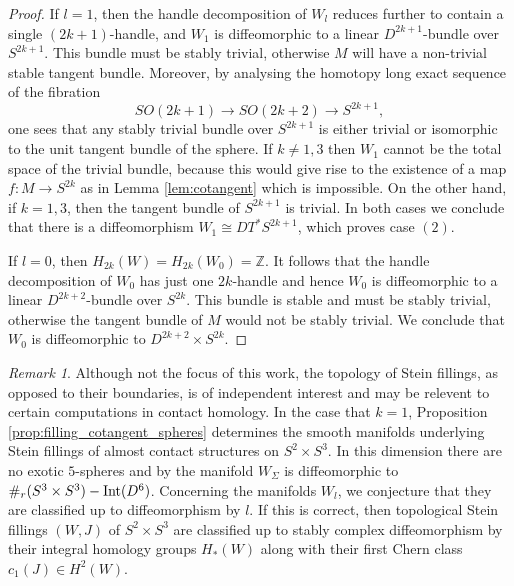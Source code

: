 \documentclass[12pt]{amsart}
\newcommand\Z{\mathbb{Z}}
\theoremstyle{remark}
\newtheorem{Remark}[Theorem]{Remark}
\newcommand{\jbcomm}[1]{\begingroup\color{green}JB:~#1\endgroup}
\begin{document}
\begin{proof}
If $l = 1$, then the handle decomposition of $W_l$ reduces further to
contain a single $(2k{+}1)$-handle, and $W_1$ is diffeomorphic to a
linear $D^{2k{+}1}$-bundle over $S^{2k{+}1}$.  This bundle must be stably
trivial, otherwise $M$ will have a non{-}trivial stable tangent bundle.
Moreover, by analysing the homotopy long exact sequence of the fibration
\[
SO(2k{+}1) \to SO(2k{+}2) \to S^{2k{+}1},
\]
one sees that any stably trivial bundle over $S^{2k{+}1}$ is either
trivial or isomorphic to the unit tangent bundle of the sphere. If $k
\neq 1, 3$ then $W_1$ cannot be the total space of the trivial bundle,
because this would give rise to the existence of a map $f \colon M \to
S^{2k}$ as in Lemma \ref{lem:cotangent} which is impossible.  On the
other hand, if $k = 1, 3$, then the tangent bundle of $S^{2k{+}1}$ is trivial.
In both cases we conclude that there is a diffeomorphism $W_1 \cong
DT^*S^{2k{+}1}$, which proves case $(2)$.

If $l = 0$, then $H_{2k}(W) = H_{2k}(W_0) =\Z$. 
It follows that the handle
decomposition of $W_0$ has just one $2k$-handle and hence $W_0$ is
diffeomorphic to a linear $D^{2k{+}2}$-bundle over $S^{2k}$.  This
bundle is stable and must be stably trivial, otherwise the tangent bundle of
$M$ would not be stably trivial.  We conclude that $W_0$ is
diffeomorphic to $D^{2k{+}2} \times S^{2k}$.
\end{proof}


\begin{Remark} \label{rem:6d-fillings}
Although not the focus of this work, the topology of Stein fillings,
as opposed to their boundaries, is of independent interest and may be
relevent to certain computations in contact homology.  In the case that $k = 1$, Proposition \ref{prop:filling_cotangent_spheres} determines the
smooth manifolds underlying Stein fillings of almost contact
structures on $S^2 \times S^3$.  In this dimension there are no exotic
$5$-spheres \cite{Kervaire-Milnor63} and by \cite[Theorem
  6.2]{Smale62} the manifold $W_\Sigma$ is diffeomorphic to $\#_r(S^3
\times S^3)-{\rm Int}(D^6)$.  Concerning the manifolds $W_l$, we
conjecture that they are classified up to diffeomorphism by $l$.  If
this is correct, then topological Stein fillings $(W, J)$ of $S^2
\times S^3$ are classified up to stably complex diffeomorphism by
their integral homology groups $H_*(W)$ along with their first Chern class 
$c_1(J) \in H^2(W)$.
\end{Remark}
\end{document}
